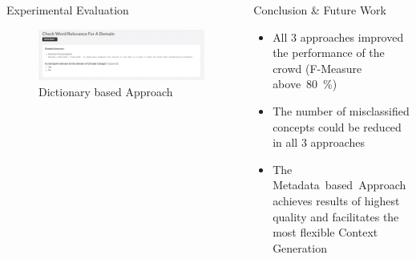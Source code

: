 \documentclass[final,hyperref={pdfpagelabels=true}]{beamer}
\begin{document}
\begin{frame}
\begin{columns}[t, onlytextwidth]
\begin{column}{\textwidth}
\begin{columns}[t, onlytextwidth]
\begin{column}{.49\textwidth}
\begin{block}{Experimental Evaluation}
\begin{minipage}[t][.25\textheight][c]{\textwidth}
\begin{minipage}[t]{0.93\textwidth}
\begin{minipage}[t]{\textwidth}
\begin{minipage}[t]{.49\textwidth}
\begin{minipage}[t]{\textwidth}
										\begin{figure}[H]
										 \centering
										 \includegraphics[width=\textwidth]{figures/questionaire_wordnik_example}
										 \caption{Dictionary based Approach}
										\end{figure}
									\end{minipage}
								\end{minipage}
							\end{minipage}
						\end{minipage}
						\hfill
						\hbox{}
						
					\end{minipage}
				\end{block}
			\end{column}
			\begin{column}{.49\textwidth}
				\begin{block}{Conclusion \& Future Work}
					\begin{minipage}[t][.25\textheight][c]{\textwidth}
						\hfill
						\begin{minipage}[t]{0.93\textwidth}
							\small
							{}
							
							\begin{itemize}
								\small
								\justifying
								\setlength\itemsep{1cm}
								\item All 3 approaches improved the performance of the crowd (F-Measure above~80~\%)
								\item The number of misclassified concepts could be reduced in all 3 approaches
								\item The Metadata~based~Approach achieves results of highest quality and facilitates the most flexible Context Generation
							\end{itemize}
							\vspace{1cm}
							
							\hrulefill
							
							\vspace{1.5cm}
							\small
							{}
							

\end{minipage}
\end{minipage}
\end{block}
\end{column}
\end{columns}
\end{column}
\end{columns}
\end{frame}
\end{document}
